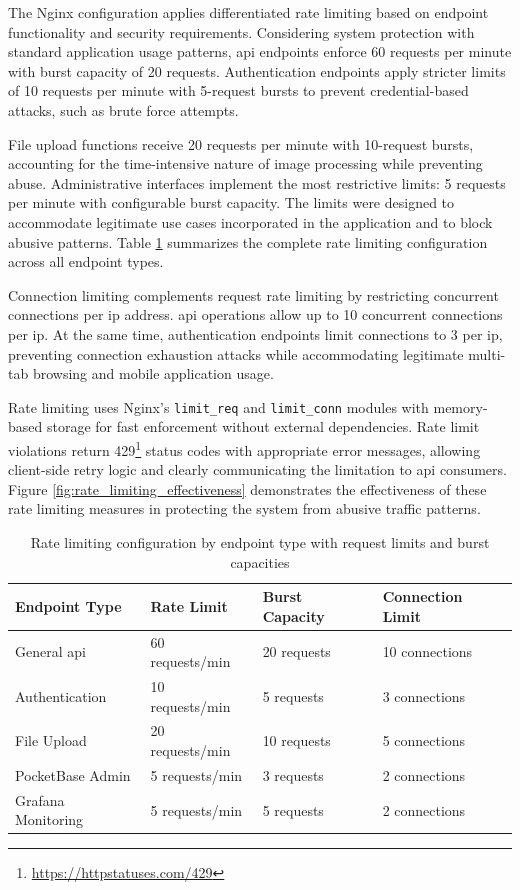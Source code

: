 The Nginx configuration applies differentiated rate limiting based on endpoint functionality and security requirements. Considering system protection with standard application usage patterns, \ac{api} endpoints enforce 60 requests per minute with burst capacity of 20 requests. Authentication endpoints apply stricter limits of 10 requests per minute with 5-request bursts to prevent credential-based attacks, such as brute force attempts.

File upload functions receive 20 requests per minute with 10-request bursts, accounting for the time-intensive nature of image processing while preventing abuse. Administrative interfaces implement the most restrictive limits: 5 requests per minute with configurable burst capacity. The limits were designed to accommodate legitimate use cases incorporated in the application and to block abusive patterns. Table \ref{tab:rate_limiting_config} summarizes the complete rate limiting configuration across all endpoint types.

Connection limiting complements request rate limiting by restricting concurrent connections per \ac{ip} address. \ac{api} operations allow up to 10 concurrent connections per \ac{ip}. At the same time, authentication endpoints limit connections to 3 per \ac{ip}, preventing connection exhaustion attacks while accommodating legitimate multi-tab browsing and mobile application usage.

Rate limiting uses Nginx's \texttt{limit\_req} and \texttt{limit\_conn} modules with memory-based storage for fast enforcement without external dependencies. Rate limit violations return 429\footnote{\url{https://httpstatuses.com/429}} status codes with appropriate error messages, allowing client-side retry logic and clearly communicating the limitation to \ac{api} consumers. Figure \ref{fig:rate_limiting_effectiveness} demonstrates the effectiveness of these rate limiting measures in protecting the system from abusive traffic patterns.

\begin{table}[htbp]
    \centering
    \caption[Rate Limiting Configuration]{Rate limiting configuration by endpoint type with request limits and burst capacities}
    \label{tab:rate_limiting_config}
    \begin{tabular}{@{}llll@{}}
        \toprule
        \textbf{Endpoint Type} & \textbf{Rate Limit} & \textbf{Burst Capacity} & \textbf{Connection Limit} \\
        \midrule
        General \ac{api} & 60 requests/min & 20 requests & 10 connections \\
        Authentication & 10 requests/min & 5 requests & 3 connections \\
        File Upload & 20 requests/min & 10 requests & 5 connections \\
        PocketBase Admin & 5 requests/min & 3 requests & 2 connections \\
        Grafana Monitoring & 5 requests/min & 5 requests & 2 connections \\
        \bottomrule
    \end{tabular}
\end{table}

